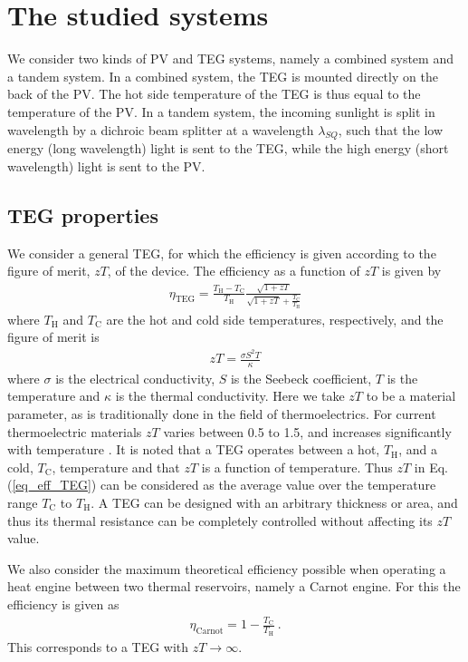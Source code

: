 \documentclass[fleqn,10pt]{SelfArx} %
\newcommand{\n}[1]{\mathrm{#1}}
\begin{document}
\section{The studied systems}
We consider two kinds of PV and TEG systems, namely a combined system and a tandem system. In a combined system, the TEG is mounted directly on the back of the PV. The hot side temperature of the TEG is thus equal to the temperature of the PV. In a tandem system, the incoming sunlight is split in wavelength by a dichroic beam splitter at a wavelength $\lambda_{SQ}$, such that the low energy (long wavelength) light is sent to the TEG, while the high energy (short wavelength) light is sent to the PV.

\subsection{TEG properties}
We consider a general TEG, for which the efficiency is given according to the figure of merit, $zT$, of the device. The efficiency as a function of $zT$ is given by \citep{TE_Handbook_Ch9}
\begin{eqnarray}
\eta_\n{TEG} = \frac{T_\n{H}-T_\n{C}}{T_\n{H}}\frac{\sqrt{1+zT}}{\sqrt{1+zT}+\frac{T_\n{C}}{T_\n{H}}}\label{eq_eff_TEG}
\end{eqnarray}
where $T_\n{H}$ and $T_\n{C}$ are the hot and cold side temperatures, respectively, and the figure of merit is
\begin{eqnarray}
zT = \frac{\sigma{}S^2T}{\kappa}
\end{eqnarray}
where $\sigma$ is the electrical conductivity, $S$ is the Seebeck coefficient, $T$ is the temperature and $\kappa$ is the thermal conductivity. Here we take $zT$ to be a material parameter, as is traditionally done in the field of thermoelectrics. For current thermoelectric materials $zT$ varies between 0.5 to 1.5, and increases significantly with temperature \cite{Ngan_2014,Bjoerk_2015}. It is noted that a TEG operates between a hot, $T_\mathrm{H}$, and a cold, $T_\mathrm{C}$, temperature and that $zT$ is a function of temperature. Thus $zT$ in Eq. (\ref{eq_eff_TEG}) can be considered as the average value over the temperature range $T_\mathrm{C}$ to $T_\mathrm{H}$. A TEG can be designed with an arbitrary thickness or area, and thus its thermal resistance can be completely controlled without affecting its $zT$ value.

We also consider the maximum theoretical efficiency possible when operating a heat engine between two thermal reservoirs, namely a Carnot engine. For this the efficiency is given as
\begin{eqnarray}
\eta_\n{Carnot} =1- \frac{T_\n{C}}{T_\n{H}}~.
\end{eqnarray}
This corresponds to a TEG with $zT\rightarrow{}\infty{}$.
\end{document}

